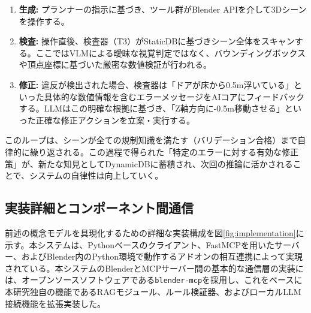 \documentclass[dvipdfmx, a4paper, 9pt]{deimj}
\begin{document}
\begin{enumerate}
  \item \textbf{生成:} プランナーの指示に基づき、ツール群がBlender APIを介して3Dシーンを操作する。
  \item \textbf{検査:} 操作直後、検査器（T3）がStaticDBに基づきシーン全体をスキャンする。ここではVLMによる曖昧な視覚判定ではなく、バウンディングボックスや頂点座標に基づいた厳密な数値検証が行われる。
  \item \textbf{修正:} 違反が検出された場合、検査器は「ドアが床から0.5m浮いている」といった具体的な数値情報を含むエラーメッセージをAIコアにフィードバックする。LLMはこの明確な根拠に基づき、「Z軸方向に-0.5m移動させる」といった正確な修正アクションを立案・実行する。
\end{enumerate}

このループは、シーンが全ての規制知識を満たす（バリデーション合格）まで自律的に繰り返される。この過程で得られた「特定のエラーに対する有効な修正策」が、新たな知見としてDynamicDBに蓄積され、次回の推論に活かされることで、システムの自律性は向上していく。

\subsection{実装詳細とコンポーネント間通信}

前述の概念モデルを具現化するための詳細な実装構成を図\ref{fig:implementation}に示す。本システムは、Pythonベースのクライアント、FastMCPを用いたサーバー、およびBlender内のPython環境で動作するアドオンの相互連携によって実現されている。本システムのBlenderとMCPサーバー間の基本的な通信層の実装には、オープンソースソフトウェアである\texttt{blender-mcp}\cite{ahuja2025blendermcp}を採用し、これをベースに本研究独自の機能であるRAGモジュール、ルール検証器、およびローカルLLM接続機能を拡張実装した。
\end{document}
